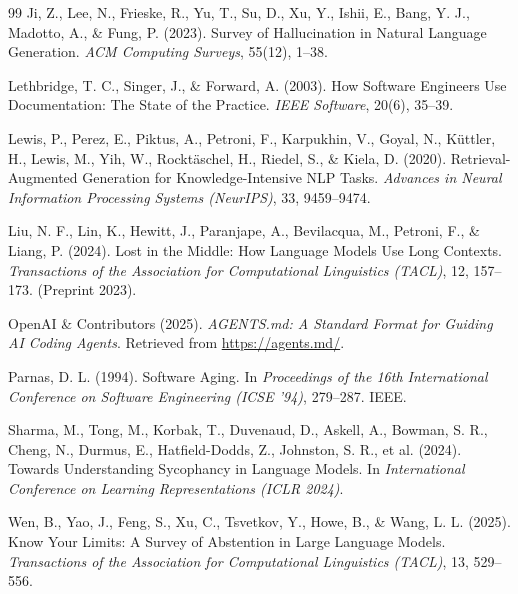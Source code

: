 \documentclass[12pt, a4paper]{article}
\begin{document}
\begin{thebibliography}{99}
Ji, Z., Lee, N., Frieske, R., Yu, T., Su, D., Xu, Y., Ishii, E., Bang, Y. J., Madotto, A., \& Fung, P. (2023). Survey of Hallucination in Natural Language Generation. \textit{ACM Computing Surveys}, 55(12), 1--38.

Lethbridge, T. C., Singer, J., \& Forward, A. (2003). How Software Engineers Use Documentation: The State of the Practice. \textit{IEEE Software}, 20(6), 35--39.

Lewis, P., Perez, E., Piktus, A., Petroni, F., Karpukhin, V., Goyal, N., K\"uttler, H., Lewis, M., Yih, W., Rockt\"aschel, H., Riedel, S., \& Kiela, D. (2020). Retrieval-Augmented Generation for Knowledge-Intensive NLP Tasks. \textit{Advances in Neural Information Processing Systems (NeurIPS)}, 33, 9459--9474.

Liu, N. F., Lin, K., Hewitt, J., Paranjape, A., Bevilacqua, M., Petroni, F., \& Liang, P. (2024). Lost in the Middle: How Language Models Use Long Contexts. \textit{Transactions of the Association for Computational Linguistics (TACL)}, 12, 157--173. (Preprint 2023).

OpenAI \& Contributors (2025). \textit{AGENTS.md: A Standard Format for Guiding AI Coding Agents}. Retrieved from \url{https://agents.md/}.

Parnas, D. L. (1994). Software Aging. In \textit{Proceedings of the 16th International Conference on Software Engineering (ICSE '94)}, 279--287. IEEE.

Sharma, M., Tong, M., Korbak, T., Duvenaud, D., Askell, A., Bowman, S. R., Cheng, N., Durmus, E., Hatfield-Dodds, Z., Johnston, S. R., et al. (2024). Towards Understanding Sycophancy in Language Models. In \textit{International Conference on Learning Representations (ICLR 2024)}.

Wen, B., Yao, J., Feng, S., Xu, C., Tsvetkov, Y., Howe, B., \& Wang, L. L. (2025). Know Your Limits: A Survey of Abstention in Large Language Models. \textit{Transactions of the Association for Computational Linguistics (TACL)}, 13, 529--556.

\end{thebibliography}
\endgroup


\clearpage
\appendix
\end{document}
